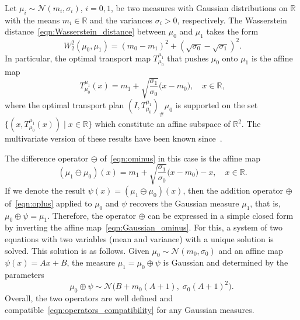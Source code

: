 \documentclass[12pt]{amsart}
\begin{document}
Let $\mu_i\sim\mathcal{N}(m_i, \sigma_i)$, $i=0,1$, be two measures with Gaussian distributions on $\mathbb{R}$ with the means $m_i\in\mathbb{R}$ and the variances $\sigma_i>0$, respectively. The Wasserstein distance~\eqref{eqn:Wasserstein_distance} between $\mu_0$ and $\mu_1$ takes the form
\begin{equation}~\label{eqn:Gaussian_Wasserstein_distance}
    W_2^2(\mu_0, \mu_1)=(m_0-m_1)^2 + (\sqrt{\sigma_0}-\sqrt{\sigma_1})^2.
\end{equation}
In particular, the optimal transport map $T_{\mu_0}^{\mu_1}$ that pushes $\mu_0$ onto $\mu_1$ is the affine map
\begin{equation}~\label{eqn:Gaussian_optimal_transport}
    T_{\mu_0}^{\mu_1}(x)=m_1+\sqrt{\frac{\sigma_1}{\sigma_0}}\big(x-m_0\big), \quad x\in\mathbb{R},
\end{equation}
where the optimal transport plan $(I,T_{\mu_0}^{\mu_1})_{\#}\mu_0$ is supported on the set $\{(x,T_{\mu_0}^{\mu_1}(x))\;|\;x\in\mathbb{R}\}$ which constitute an affine subspace of $\mathbb{R}^2$. The multivariate version of these results have been known since~\cite{dowson1982frechet}.

The difference operator $\ominus$ of~\eqref{eqn:ominus} in this case is the affine map
\begin{equation}~\label{eqn:Gaussian_ominus}
    (\mu_1 \ominus\mu_0)(x) = m_1+\sqrt{\frac{\sigma_1}{\sigma_0}}\big(x-m_0\big)-x, \quad x\in\mathbb{R}.
\end{equation}
If we denote the result $\psi(x)=(\mu_1\ominus\mu_0)(x)$, then the addition operator $\oplus$ of~\eqref{eqn:oplus} applied to $\mu_0$ and $\psi$ recovers the Gaussian measure $\mu_1$, that is, $\mu_0\oplus \psi=\mu_1$. Therefore, the operator $\oplus$ can be expressed in a simple closed form by inverting the affine map~\eqref{eqn:Gaussian_ominus}. For this, a system of two equations with two variables (mean and variance) with a unique solution is solved. This solution is as follows. Given $\mu_0\sim\mathcal{N}(m_0,\sigma_0)$ and an affine map $\psi(x)=Ax+B$, the measure $\mu_1=\mu_0\oplus \psi$ is Gaussian and determined by the parameters
\begin{equation}
    \mu_0\oplus \psi\sim\mathcal{N}\big(B+m_0(A+1),\;\sigma_0(A+1)^2\big).
\end{equation}
Overall, the two operators are well defined and compatible~\eqref{eqn:operators_compatibility} for any Gaussian measures.
\end{document}
